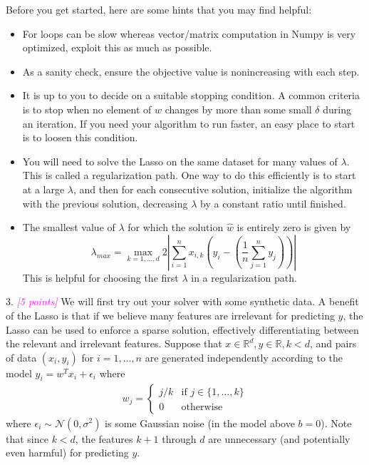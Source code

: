 \documentclass{article}
\newcommand{\1}{\mathbf{1}}
\newcommand{\grade}[1]{\small\textcolor{magenta}{\emph{[#1 points]}} \normalsize}
\begin{document}
Before you get started, here are some hints that you may find helpful:
\begin{itemize}
  \item For loops can be slow whereas vector/matrix computation in Numpy is very optimized, exploit this as much as possible.
  \item As a sanity check, ensure the objective value is nonincreasing with each step. 
  \item It is up to you to decide on a suitable stopping condition.  A common criteria is to stop when no element of
      ${w}$ changes by more than some small $\delta$ during an iteration.  If you need your algorithm to run faster,
      an easy place to start is to loosen this condition.
  \item You will need to solve the Lasso on the same dataset for many values of $\lambda$.  This
      is called a regularization path.  One way to do this efficiently is to start at a large $\lambda$, and then for
      each consecutive solution, initialize the algorithm with the previous solution, decreasing $\lambda$ by a constant
      ratio until finished.
  \item The smallest value of $\lambda$ for which the solution $\widehat{w}$ is entirely zero is given by
      \[ \lambda_{max} = \max_{k=1,\dots,d} 2 \left|\sum_{i=1}^n {x}_{i,k} \left({y}_i - \left(\frac{1}{n} \sum_{j=1}^n y_j \right)\right)\right| \]
      This is helpful for choosing the first $\lambda$ in a regularization path. 
\end{itemize}



3. \grade{5}  We will first try out your solver with some synthetic data.
A benefit of the Lasso is that if we believe many features are irrelevant for predicting ${y}$, the Lasso can be used to enforce a sparse solution, effectively differentiating between the relevant and irrelevant features.
Suppose that ${x} \in \mathbb{R}^d, y \in \mathbb{R}, k < d$, and pairs of data $({x}_i, y_i)$ for $i=1,\dots,n$ are generated independently according to the model $y_i = w^T x_i + \epsilon_i$ where
\begin{align*}
w_j = \begin{cases} j/k & \text{if } j \in \{1,\dots,k\} \\
0 & \text{otherwise}
\end{cases}
\end{align*} 
where $\epsilon_i \sim \mathcal{N}(0, \sigma^2)$ is some Gaussian noise (in the model above $b=0$).  Note that since $k < d$, the features $k + 1$ through $d$ are unnecessary (and potentially even harmful) for predicting $y$.
\end{document}
